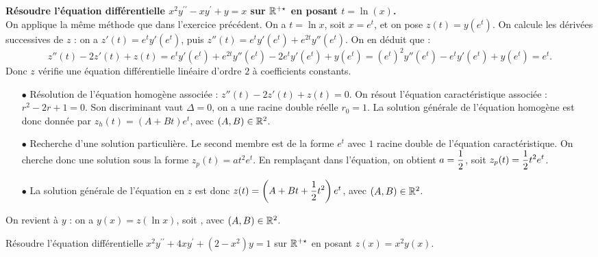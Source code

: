 \documentclass[a4paper, 11pt,reqno]{article}
\begin{document}
\begin{correction}  \;
\textbf{R\'esoudre l'\'equation diff\'erentielle $x^2y^{\prime\prime}-xy^{\prime}+y=x$ sur $\mathbb{R}^{+\star}$ en posant $t=\ln{(x)}$.}\\
On applique la m\^eme m\'ethode que dans l'exercice pr\'ec\'edent. On a $t= \ln x$, soit $x=e^t$, et on pose $z(t) = y(e^t)$. On calcule les d\'eriv\'ees successives de $z$ : on a $z'(t) = e^t y'(e^t)$, puis $z''(t) = e^t y'(e^t) + e^{2t} y''(e^t)$. On en d\'eduit que :
$$z''(t) - 2z'(t) + z(t) = e^t y'(e^t) + e^{2t} y''(e^t) - 2 e^t y'(e^t) + y(e^t) = (e^t)^2 y''(e^t) - e^t y'(e^t) + y(e^t) = e^t.$$
Donc $z$ v\'erifie une \'equation diff\'erentielle lin\'eaire d'ordre $2$ \`a coefficients constants.
\begin{itemize}
\item[$\bullet$] R\'esolution de l'\'equation homog\`ene associ\'ee : $z''(t) - 2z'(t) + z(t) =0$. On r\'esout l'\'equation caract\'eristique associ\'ee : $r^2-2r+1=0$. Son discriminant vaut $\Delta = 0$, on a une racine double r\'eelle $r_0=1$. La solution g\'en\'erale de l'\'equation homog\`ene est donc donn\'ee par $z_h(t) = (A+Bt) e^{t}$, avec $(A,B) \in \mathbb{R}^2$.
\item[$\bullet$] Recherche d'une solution particuli\`ere. Le second membre est de la forme $e^t$ avec $1$ racine double de l'\'equation caract\'eristique. On cherche donc une solution sous la forme $z_p(t) = at^2e^t$. En rempla\c cant dans l'\'equation, on obtient $a=\displaystyle \frac{1}{2}$, soit $z_p(t) = \displaystyle \frac{1}{2}t^2e^t$.
\item[$\bullet$] La solution g\'en\'erale de l'\'equation en $z$ est donc $z(t) = \left(A+Bt + \displaystyle \frac{1}{2}t^2 \right) e^{t}$, avec $(A,B) \in \mathbb{R}^2$.
\end{itemize}
On revient \`a $y$ : on a $y(x) = z(\ln x)$, soit  , avec  $(A,B) \in \mathbb{R}^2$.
\end{correction}
\begin{exercice}  \;
R\'esoudre l'\'equation diff\'erentielle $x^2y^{\prime\prime}+4xy^{\prime}+(2-x^2)y=1$ sur $\mathbb{R}^{+\star}$ en posant $z(x)=x^2y(x)$.
\end{exercice}
\end{document}

